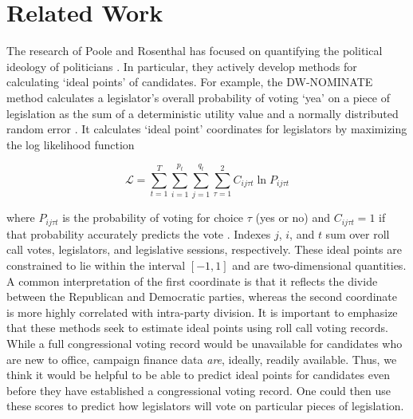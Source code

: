 \documentclass[12]{article}
\begin{document}
\section*{Related Work}

\noindent The research of Poole and Rosenthal has focused on quantifying the political ideology of politicians \cite{PR}. In particular, they actively develop methods for calculating `ideal points' of candidates. For example, the DW-NOMINATE method calculates a legislator’s overall probability of voting `yea' on a piece of legislation as the sum of a deterministic utility value and a normally distributed random error \cite{NOMBOOT}. It calculates `ideal point' coordinates for legislators by maximizing the log likelihood function

\[ \mathcal{L} = \sum_{t=1}^{T} \sum_{i=1}^{p_t} \sum_{j=1}^{q_t} \sum_{\tau = 1}^{2} C_{ij \tau t} \ln P_{ij \tau t} \]

\noindent where $P_{ij \tau t}$ is the probability of voting for choice $\tau$ (yes or no) and $C_{ij \tau t} = 1$ if that probability accurately predicts the vote \cite{NOMBOOT}. Indexes $j$, $i$, and $t$ sum over roll call votes, legislators, and legislative sessions, respectively. These ideal points are constrained to lie within the interval $\left[ -1,1 \right]$ and are two-dimensional quantities. A common interpretation of the first coordinate is that it reflects the divide between the Republican and Democratic parties, whereas the second coordinate is more highly correlated with intra-party division. It is important to emphasize that these methods seek to estimate ideal points using roll call voting records. While a full congressional voting record would be unavailable for candidates who are new to office, campaign finance data \textit{are}, ideally, readily available. Thus, we think it would be helpful to be able to predict ideal points for candidates even before they have established a congressional voting record. One could then use these scores to predict how legislators will vote on particular pieces of legislation.\\
\end{document}

